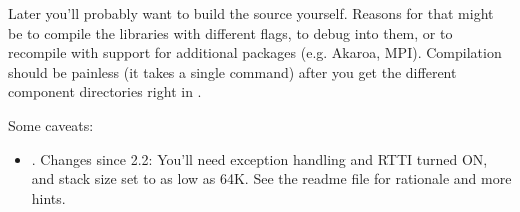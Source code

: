 Later you'll probably want to build the source yourself.
Reasons for that might be to compile the libraries
with different flags, to debug into them, or to recompile
with support for additional packages (e.g. Akaroa, MPI).
Compilation should be painless (it takes a single
 command) after you get the different
component directories right in .


Some caveats:

\begin{itemize}

 \item {}. Changes since {\opp} 2.2:
   You'll need exception handling and RTTI turned ON, and
   stack size set to as low as 64K.
   See the readme file for rationale and more hints.

\end{itemize}



